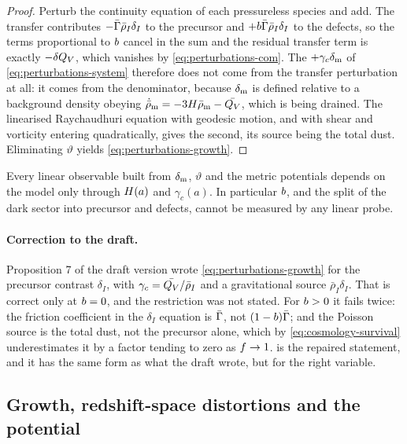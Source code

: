\begin{proof}
  Perturb the continuity equation of each pressureless species and add. The
  transfer contributes $-\bar{\Gamma}\bar\rho_I\delta_I$ to the precursor and
  $+b\bar{\Gamma}\bar\rho_I\delta_I$ to the defects, so the terms proportional
  to $b$ cancel in the sum and the residual transfer term is exactly
  $-\delta Q_{V}$, which vanishes by \cref{eq:perturbations-com}. The
  $+\gamma_c\delta_{\rm m}$ of \cref{eq:perturbations-system} therefore does not
  come from the transfer perturbation at all: it comes from the denominator,
  because $\delta_{\rm m}$ is defined relative to a background density obeying
  $\dot{\bar\rho}_{\rm m}=-3H\bar\rho_{\rm m}-\bar {Q_{V}}$, which is being
  drained. The linearised Raychaudhuri
  equation with geodesic motion, and with shear and vorticity entering
  quadratically, gives the second, its source being the total dust.
  Eliminating $\vartheta$ yields \cref{eq:perturbations-growth}.
\end{proof}

\begin{corollary}\label{cor:b-invisible}
  Every linear observable built from $\delta_{\rm m}$, $\vartheta$ and the
  metric potentials depends on the model only through $H(a)$ and
  $\gamma_c(a)$. In particular $b$, and the split of the dark sector into
  precursor and defects, cannot be measured by any linear probe.
\end{corollary}

\paragraph{Correction to the draft.} Proposition 7 of the draft version wrote
\cref{eq:perturbations-growth} for the precursor contrast $\delta_I$, with
$\gamma_c=\bar {Q_{V}}/\bar\rho_I$ and a gravitational source $\bar\rho_I\delta_I$.
That is correct only at $b=0$, and the restriction was not stated. For
$b>0$ it fails twice: the friction coefficient in the $\delta_I$ equation
is $\bar{\Gamma}$, not $(1-b)\bar{\Gamma}$; and the Poisson source is the total
dust, not the precursor alone, which by
\cref{eq:cosmology-survival} underestimates it by a factor tending to zero as
$f\to1$.  is the repaired statement, and it has
the same form as what the draft wrote, but for the right variable.

\subsection{Growth, redshift-space distortions and the potential}
\label{sec:perturbations-growth}


